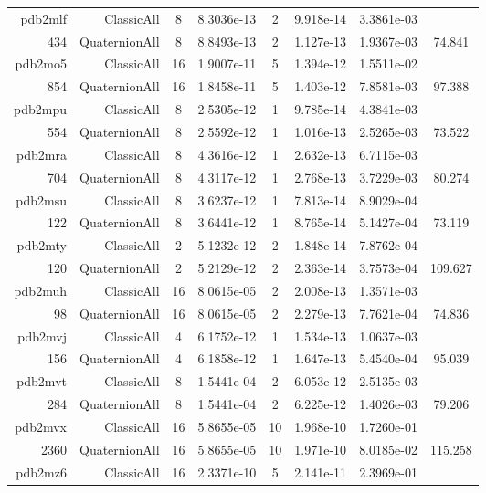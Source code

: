 \begin{xltabular}{\textwidth}{r|rcS[table-format=1.4e+2]cS[table-format=1.3e+2]S[table-format=1.4e+2]S[table-format=-1.3]}
pdb2mlf & ClassicAll & 8 & 8.3036e-13 & 2 & 9.918e-14 & 3.3861e-03 & \\
434 & QuaternionAll & 8 & 8.8493e-13 & 2 & 1.127e-13 & 1.9367e-03 & 74.841\\  \addlinespace
pdb2mo5 & ClassicAll & 16 & 1.9007e-11 & 5 & 1.394e-12 & 1.5511e-02 & \\
854 & QuaternionAll & 16 & 1.8458e-11 & 5 & 1.403e-12 & 7.8581e-03 & 97.388\\  \addlinespace
pdb2mpu & ClassicAll & 8 & 2.5305e-12 & 1 & 9.785e-14 & 4.3841e-03 & \\
554 & QuaternionAll & 8 & 2.5592e-12 & 1 & 1.016e-13 & 2.5265e-03 & 73.522\\  \addlinespace
pdb2mra & ClassicAll & 8 & 4.3616e-12 & 1 & 2.632e-13 & 6.7115e-03 & \\
704 & QuaternionAll & 8 & 4.3117e-12 & 1 & 2.768e-13 & 3.7229e-03 & 80.274\\  \addlinespace
pdb2msu & ClassicAll & 8 & 3.6237e-12 & 1 & 7.813e-14 & 8.9029e-04 & \\
122 & QuaternionAll & 8 & 3.6441e-12 & 1 & 8.765e-14 & 5.1427e-04 & 73.119\\  \addlinespace
pdb2mty & ClassicAll & 2 & 5.1232e-12 & 2 & 1.848e-14 & 7.8762e-04 & \\
120 & QuaternionAll & 2 & 5.2129e-12 & 2 & 2.363e-14 & 3.7573e-04 & 109.627\\  \addlinespace
pdb2muh & ClassicAll & 16 & 8.0615e-05 & 2 & 2.008e-13 & 1.3571e-03 & \\
98 & QuaternionAll & 16 & 8.0615e-05 & 2 & 2.279e-13 & 7.7621e-04 & 74.836\\  \addlinespace
pdb2mvj & ClassicAll & 4 & 6.1752e-12 & 1 & 1.534e-13 & 1.0637e-03 & \\
156 & QuaternionAll & 4 & 6.1858e-12 & 1 & 1.647e-13 & 5.4540e-04 & 95.039\\  \addlinespace
pdb2mvt & ClassicAll & 8 & 1.5441e-04 & 2 & 6.053e-12 & 2.5135e-03 & \\
284 & QuaternionAll & 8 & 1.5441e-04 & 2 & 6.225e-12 & 1.4026e-03 & 79.206\\  \addlinespace
pdb2mvx & ClassicAll & 16 & 5.8655e-05 & 10 & 1.968e-10 & 1.7260e-01 & \\
2360 & QuaternionAll & 16 & 5.8655e-05 & 10 & 1.971e-10 & 8.0185e-02 & 115.258\\  \addlinespace
pdb2mz6 & ClassicAll & 16 & 2.3371e-10 & 5 & 2.141e-11 & 2.3969e-01 & \\

\end{xltabular}
